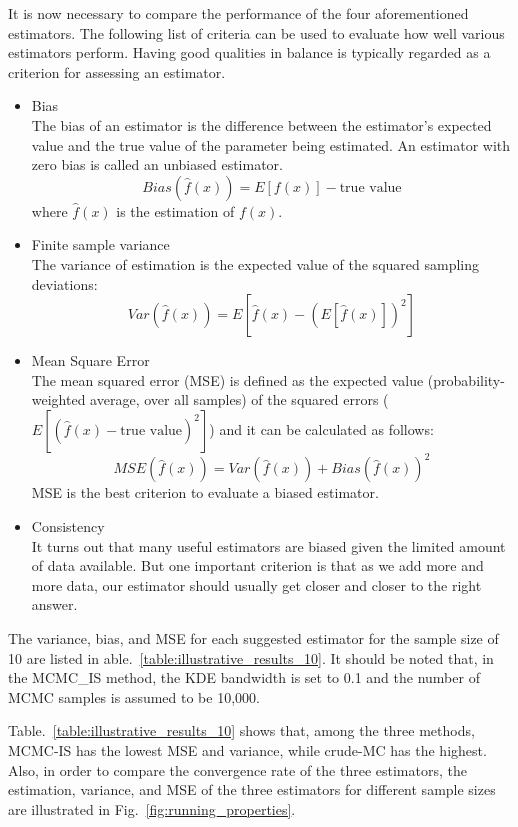     It is now necessary to compare the performance of the four aforementioned estimators. The following list of criteria can be used to evaluate how well various estimators perform. Having good qualities in balance is typically regarded as a criterion for assessing an estimator.
    \begin{itemize}[leftmargin=*]
      \item Bias\\
        The bias of an estimator is the difference between the estimator's expected value and the true value of the parameter being estimated. An estimator with zero bias is called an unbiased estimator.
        $$
        Bias(\widehat{f}(x))=E[f(x)]-\text{true value}
        $$
        where $\widehat{f}(x)$ is the estimation of $f(x)$.
      \item Finite sample variance\\
      The variance of estimation is the expected value of the squared sampling deviations: 
        $$
        Var(\widehat{f}(x))=E[\widehat{f}(x)-(E[\widehat{f}(x)])^2]
        $$
      \item Mean Square Error\\
        The mean squared error (MSE) is defined as the expected value (probability-weighted average, over all samples) of the squared errors ($E[(\widehat{f}(x)-\text{true value})^{2}]$) and it can be calculated as follows: 
        $$ 
        MSE(\widehat{f}(x))=Var(\widehat{f}(x))+Bias(\widehat{f}(x))^{2}
        $$
        MSE is the best criterion to evaluate a biased estimator.
        \item Consistency\\
        It turns out that many useful estimators are biased given the limited amount of data available. But one important criterion is that as we add more and more data, our estimator should usually get closer and closer to the right answer.
    \end{itemize}

    The variance, bias, and MSE for each suggested estimator for the sample size of 10 are listed in able.~\ref{table:illustrative_results_10}. It should be noted that, in the MCMC\_IS method, the KDE bandwidth is set to 0.1 and the number of MCMC samples is assumed to be 10,000.

    

    Table.~\ref{table:illustrative_results_10} shows that, among the three methods, MCMC-IS has the lowest MSE and variance, while crude-MC has the highest. \\
    Also, in order to compare the convergence rate of the three estimators, the estimation, variance, and MSE of the three estimators for different sample sizes are illustrated in Fig.~\ref{fig:running_properties}.\\

    
    

    
        
        
